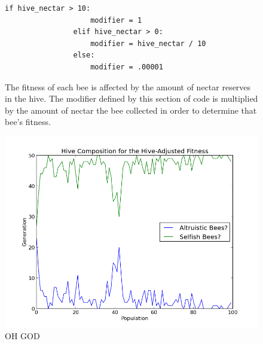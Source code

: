 \documentclass[11pt]{article}
\begin{document}
			\begin{figure}[tb]
				\begin{Verbatim}[frame=single]
                if hive_nectar > 10:
                    modifier = 1
                elif hive_nectar > 0:
                    modifier = hive_nectar / 10
                else:
                    modifier = .00001 
				\end{Verbatim}
				\caption{The fitness of each bee is affected by the amount of nectar reserves in the hive. The modifier defined by this section of code is multiplied by the amount of nectar the bee collected in order to determine that bee's fitness.}
				\label{fig:modifier_algorithm}
			\end{figure}

			\begin{figure}[tb]
				\begin{center}
					\includegraphics[scale=.75]{results/hive_fitness_comp.png}
				\end{center}
				\caption{OH GOD}
				\label{fig:hive_fitness_composition}
			\end{figure}
\end{document}
